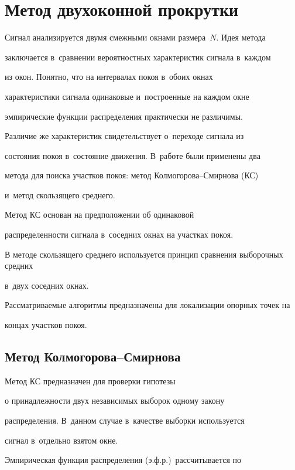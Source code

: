 \section{Метод двухоконной прокрутки}



Сигнал анализируется двумя смежными окнами размера~$N$. Идея метода

заключается в~сравнении вероятностных характеристик сигнала в~каждом

из окон. Понятно, что на интервалах покоя в~обоих окнах

характеристики сигнала одинаковые и~построенные на каждом окне

эмпирические функции распределения практически не различимы.

Различие же характеристик свидетельствует о~переходе сигнала из

состояния покоя в~состояние движения. В~работе были применены два

метода для поиска участков покоя: метод Кол\-мо\-го\-ро\-ва--Смир\-но\-ва (КС)

и~метод скользящего среднего.



Метод КС основан на предположении об одинаковой

распределенности сигнала в~соседних окнах на участках покоя.



В методе скользящего среднего используется принцип сравнения выборочных средних 

в~двух соседних окнах.

Рассматриваемые алгоритмы предназначены для локализации опорных точек на 

концах участков покоя.



\subsection{Метод Колмогорова--Смирнова}



Метод КС предназначен для проверки гипотезы

о принадлежности двух независимых выборок одному закону

распределения. В~данном случае в~качестве выборки используется

сигнал в~отдельно взятом окне.



Эмпирическая функция распределения (э.ф.р.)\ рассчитывается по

